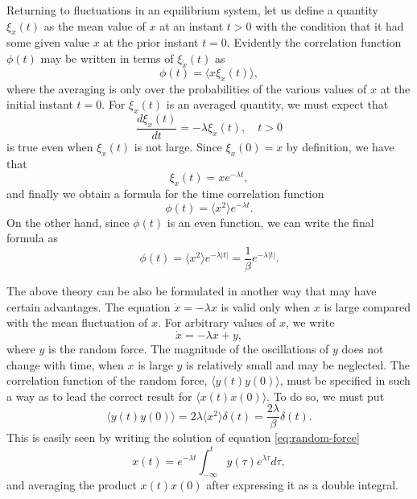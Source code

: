 \documentclass{book}
\newcommand{\average}[1]{\langle#1\rangle}
\numberwithin{equation}{section}
\begin{document}
Returning to fluctuations in an equilibrium system, let us define a
quantity $\xi_x(t)$ as the mean value of $x$ at an instant $t>0$ with
the condition that it had some given value $x$ at the prior instant
$t=0$. Evidently the correlation function $\phi(t)$ may be written in 
terms of $\xi_x(t)$ as
\begin{equation}
  \phi(t)=\average{x\xi_x(t)},
\end{equation}
where the averaging is only over the probabilities of the various
values of $x$ at the initial instant $t=0$. For $\xi_x(t)$ is an
averaged quantity, we must expect that
\begin{equation}
\frac{d\xi_x(t)}{dt}=-\lambda\xi_x(t),\quad t > 0
\end{equation}
is true even when $\xi_x(t)$ is not large. Since $\xi_x(0)=x$ by
definition, we have that
\begin{equation}
  \xi_x(t)=xe^{-\lambda t},
\end{equation}
and finally we obtain a formula for the time correlation function
\begin{equation}
  \phi(t)=\average{x^2}e^{-\lambda t}.
\end{equation}
On the other hand, since $\phi(t)$ is an even function, we can write
the final formula as
\begin{equation}
  \phi(t)=\average{x^2}e^{-\lambda |t|}=\frac{1}{\beta}e^{-\lambda|t|}.
\end{equation}

The above theory can be also be formulated in another way that may
have certain advantages. The equation $\dot{x}=-\lambda x$ is valid
only when $x$ is large compared with the mean fluctuation of $x$.  For
arbitrary values of $x$, we write
\begin{equation}
  \label{eq:random-force}
  \dot{x}=-\lambda x+y,
\end{equation}
where $y$ is the random force. The magnitude of the oscillations of
$y$ does not change with time, when $x$ is large $y$ is relatively
small and may be neglected. The correlation function of the random
force, $\average{y(t)y(0)}$, must be specified in such a way as to
lead the correct result for $\average{x(t)x(0)}$. To do so, we must 
put 
\begin{equation}
  \average{y(t)y(0)}=2\lambda\average{x^2}\delta(t)=
  \frac{2\lambda}{\beta}\delta(t).
\end{equation}
This is easily seen by writing the solution of equation
\eqref{eq:random-force}
\begin{equation}
  x(t)=e^{-\lambda t}\int_{-\infty}^{t}y(\tau)e^{\lambda\tau}d\tau,
\end{equation}
and averaging the product $x(t)x(0)$ after expressing it as a
double integral.
\end{document}
